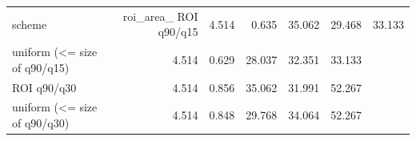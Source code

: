 \begin{tabular}{lrrrrr}
\toprule
scheme & roi_area_%
\midrule
ROI q90/q15 & 4.514 & 0.635 & 35.062 & 29.468 & 33.133 \\
uniform (<= size of q90/q15) & 4.514 & 0.629 & 28.037 & 32.351 & 33.133 \\
ROI q90/q30 & 4.514 & 0.856 & 35.062 & 31.991 & 52.267 \\
uniform (<= size of q90/q30) & 4.514 & 0.848 & 29.768 & 34.064 & 52.267 \\
\bottomrule
\end{tabular}
